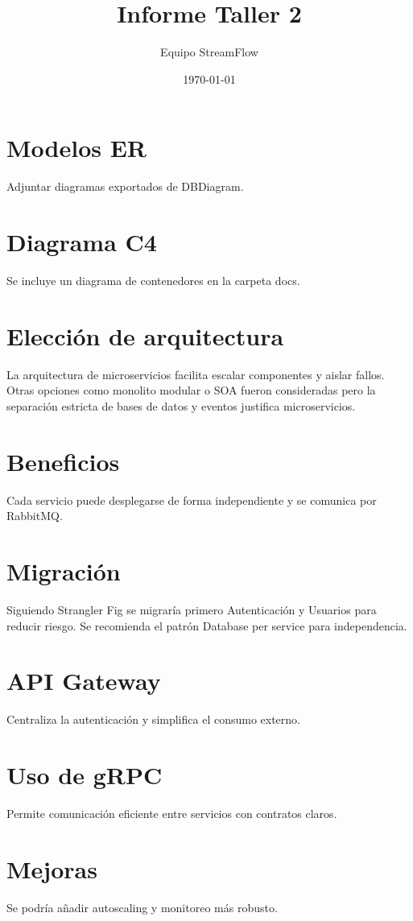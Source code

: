 \documentclass{article}
\title{Informe Taller 2}
\author{Equipo StreamFlow}
\date{\today}
\begin{document}
\maketitle
\tableofcontents
\section{Modelos ER}
Adjuntar diagramas exportados de DBDiagram.
\section{Diagrama C4}
Se incluye un diagrama de contenedores en la carpeta docs.
\section{Elección de arquitectura}
La arquitectura de microservicios facilita escalar componentes y aislar fallos.\newline
Otras opciones como monolito modular o SOA fueron consideradas pero la separación estricta de bases de datos y eventos justifica microservicios.
\section{Beneficios}
Cada servicio puede desplegarse de forma independiente y se comunica por RabbitMQ.
\section{Migración}
Siguiendo Strangler Fig se migraría primero Autenticación y Usuarios para reducir riesgo.\newline
Se recomienda el patrón Database per service para independencia.
\section{API Gateway}
Centraliza la autenticación y simplifica el consumo externo.
\section{Uso de gRPC}
Permite comunicación eficiente entre servicios con contratos claros.
\section{Mejoras}
Se podría añadir autoscaling y monitoreo más robusto.
\end{document}
